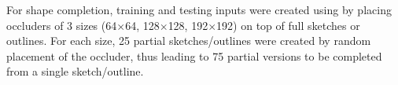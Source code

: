 
For shape completion, training and testing inputs were created using by placing occluders of 3 sizes (64$\times$64, 128$\times$128, 192$\times$192) on top of full sketches or outlines.
For each size, 25 partial sketches/outlines were created by random placement of the occluder, thus leading to 75 partial versions to be completed from a single sketch/outline. 



